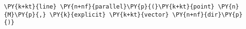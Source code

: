 \begin{Verbatim}[commandchars=\\\{\}]
    \PY{k+kt}{line} \PY{n+nf}{parallel}\PY{p}{(}\PY{k+kt}{point} \PY{n}{M}\PY{p}{,} \PY{k}{explicit} \PY{k+kt}{vector} \PY{n+nf}{dir}\PY{p}{)}
\end{Verbatim}
